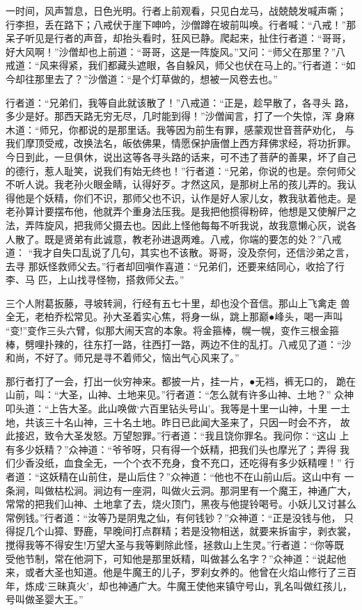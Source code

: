 一时间，风声暂息，日色光明。行者上前观看，只见白龙马，战兢兢发喊声嘶；
行李担，丢在路下；八戒伏于崖下呻吟，沙僧蹲在坡前叫唤。行者喊：“八戒！”那
呆子听见是行者的声音，却抬头看时，狂风已静。爬起来，扯住行者道：“哥哥，
好大风啊！”沙僧却也上前道：“哥哥，这是一阵旋风。”又问：“师父在那里？”八
戒道：“风来得紧，我们都藏头遮眼，各自躲风，师父也伏在马上的。”行者道：“如
今却往那里去了？”沙僧道：“是个灯草做的，想被一风卷去也。”

行者道：“兄弟们，我等自此就该散了！”八戒道：“正是，趁早散了，各寻头
路，多少是好。那西天路无穷无尽，几时能到得！”沙僧闻言，打了一个失惊，浑
身麻木道：“师兄，你都说的是那里话。我等因为前生有罪，感蒙观世音菩萨劝化，
与我们摩顶受戒，改换法名，皈依佛果，情愿保护唐僧上西方拜佛求经，将功折罪。
今日到此，一旦俱休，说出这等各寻头路的话来，可不违了菩萨的善果，坏了自己
的德行，惹人耻笑，说我们有始无终也！”行者道：“兄弟，你说的也是。奈何师父
不听人说。我老孙火眼金睛，认得好歹。才然这风，是那树上吊的孩儿弄的。我认
得他是个妖精，你们不识，那师父也不识，认作是好人家儿女，教我驮着他走。是
老孙算计要摆布他，他就弄个重身法压我。是我把他掼得粉碎，他想是又使解尸之
法，弄阵旋风，把我师父摄去也。因此上怪他每每不听我说，故我意懒心灰，说各
人散了。既是贤弟有此诚意，教老孙进退两难。八戒，你端的要怎的处？”八戒道：
“我才自失口乱说了几句，其实也不该散。哥哥，没及奈何，还信沙弟之言，去寻
那妖怪救师父去。”行者却回嗔作喜道：“兄弟们，还要来结同心，收拾了行李、马
匹，上山找寻怪物，搭救师父去。”

三个人附葛扳藤，寻坡转涧，行经有五七十里，却也没个音信。那山上飞禽走
兽全无，老柏乔松常见。孙大圣着实心焦，将身一纵，跳上那巅●峰头，喝一声叫
“变!”变作三头六臂，似那大闹天宫的本象。将金箍棒，幌一幌，变作三根金箍
棒，劈哩扑辣的，往东打一路，往西打一路，两边不住的乱打。八戒见了道：“沙
和尚，不好了。师兄是寻不着师父，恼出气心风来了。”

那行者打了一会，打出一伙穷神来。都披一片，挂一片，●无裆，裤无口的，
跪在山前，叫：“大圣，山神、土地来见。”行者道：“怎么就有许多山神、土地？”
众神叩头道：“上告大圣。此山唤做‘六百里钻头号山’。我等是十里一山神，十里
一土地，共该三十名山神，三十名土地。昨日已此闻大圣来了，只因一时会不齐，
故此接迟，致令大圣发怒。万望恕罪。”行者道：“我且饶你罪名。我问你：“这山
上有多少妖精？”众神道：“爷爷呀，只有得一个妖精，把我们头也摩光了；弄得
我们少香没纸，血食全无，一个个衣不充身，食不充口，还吃得有多少妖精哩！”
行者道：“这妖精在山前住，是山后住？”众神道：“他也不在山前山后。这山中有
一条涧，叫做枯松涧。涧边有一座洞，叫做火云洞。那洞里有一个魔王，神通广大，
常常的把我们山神、土地拿了去，烧火顶门，黑夜与他提铃喝号。小妖儿又讨甚么
常例钱。”行者道：“汝等乃是阴鬼之仙，有何钱钞？”众神道：“正是没钱与他，
只得捉几个山獐、野鹿，早晚间打点群精；若是没物相送，就要来拆宙宇，剥衣裳，
搅得我等不得安生!万望大圣与我等剿除此怪，拯救山上生灵。”行者道：“你等既
受他节制，常在他洞下，可知他是那里妖精，叫做甚么名字？”众神道：“说起他
来，或者大圣也知道。他是牛魔王的儿子，罗刹女养的。他曾在火焰山修行了三百
年，炼成‘三昧真火’，却也神通广大。牛魔王使他来镇守号山，乳名叫做红孩儿，
号叫做圣婴大王。”

